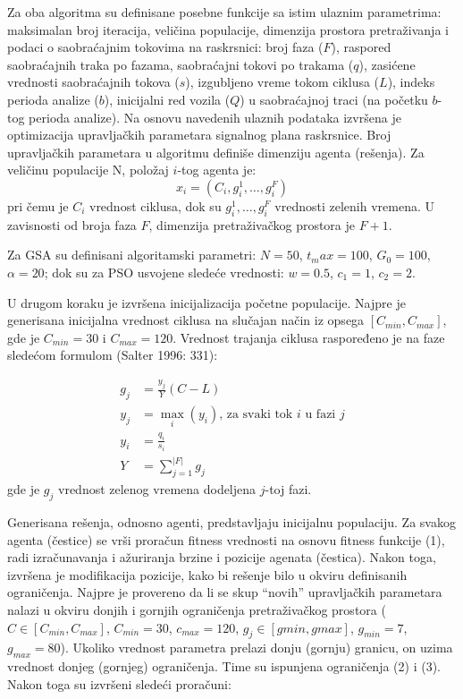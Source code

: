 Za oba algoritma su definisane posebne funkcije sa istim ulaznim parametrima: maksimalan broj iteracija, veličina populacije, dimenzija prostora pretraživanja i podaci o saobraćajnim tokovima na raskrsnici: broj faza ($F$), raspored saobraćajnih traka po fazama, saobraćajni tokovi po trakama ($q$), zasićene vrednosti saobraćajnih tokova ($s$), izgubljeno vreme tokom ciklusa ($L$), indeks perioda analize ($b$), inicijalni red vozila ($Q$) u saobraćajnoj traci (na početku $b$-tog perioda analize). Na osnovu navedenih ulaznih podataka izvršena je optimizacija upravljačkih parametara signalnog plana raskrsnice. Broj upravljačkih parametara u algoritmu definiše dimenziju agenta (rešenja). Za veličinu populacije N, položaj $i$-tog agenta je:
\begin{equation*}
    x_i = \left(C_i, g_i^1, \dots, g_i^F\right)
\end{equation*}
pri čemu je $C_i$ vrednost ciklusa, dok su $g_i^1,\dots,g_i^F$ vrednosti zelenih vremena. U zavisnosti od broja faza $F$, dimenzija pretraživačkog prostora je $F+1$.

Za GSA su definisani algoritamski parametri: $N=50$, $t_max = 100$, $G_0 = 100$, $\alpha = 20$; dok su za PSO usvojene sledeće vrednosti: $w = 0.5$, $c_1 = 1$, $c_2 = 2$.

U drugom koraku je izvršena inicijalizacija početne populacije. Najpre je generisana inicijalna vrednost ciklusa na slučajan način iz opsega $[C_{min}, C_{max}]$, gde je $C_{min} = 30$ i $C_{max} = 120$. Vrednost trajanja ciklusa raspoređeno je na faze sledećom formulom (Salter 1996: 331):

\begin{align*}
    g_j & = \frac{y_j}{Y} (C - L) \\
    y_j & = \max_i (y_i)\mbox{, za svaki tok $i$ u fazi $j$} \\
    y_i & = \frac{q_i}{s_i} \\
    Y & = \sum_{j=1}^{|F|}g_j
\end{align*}
gde je $g_j$ vrednost zelenog vremena dodeljena $j$-toj fazi. 

Generisana rešenja, odnosno agenti, predstavljaju inicijalnu populaciju. Za svakog agenta (čestice) se vrši proračun fitness vrednosti na osnovu fitness funkcije (1), radi izračunavanja i ažuriranja brzine i pozicije agenata (čestica). Nakon toga, izvršena je modifikacija pozicije, kako bi rešenje bilo u okviru definisanih ograničenja. Najpre je provereno da li se skup “novih” upravljačkih parametara nalazi u okviru donjih i gornjih ograničenja pretraživačkog prostora ($C \in [C_{min}, C_{max}]$, $C_{min}=30$, $c_{max}=120$, $g_j \in [gmin, gmax]$, $g_{min}=7$, $g_{max}=80$). Ukoliko vrednost parametra prelazi donju (gornju) granicu, on uzima vrednost donjeg (gornjeg) ograničenja. Time su ispunjena ograničenja (2) i (3). Nakon toga su izvršeni sledeći proračuni:

